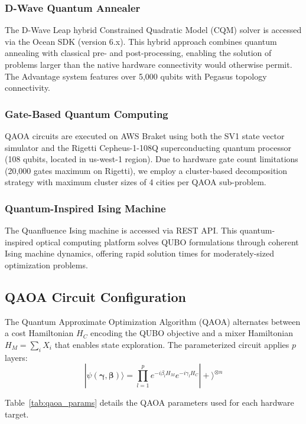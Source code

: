 \documentclass[conference]{IEEEtran}
\begin{document}
\subsubsection{D-Wave Quantum Annealer}
The D-Wave Leap hybrid Constrained Quadratic Model (CQM) solver is accessed via the Ocean SDK (version 6.x). This hybrid approach combines quantum annealing with classical pre- and post-processing, enabling the solution of problems larger than the native hardware connectivity would otherwise permit. The Advantage system features over 5,000 qubits with Pegasus topology connectivity.

\subsubsection{Gate-Based Quantum Computing}
QAOA circuits are executed on AWS Braket using both the SV1 state vector simulator and the Rigetti Cepheus-1-108Q superconducting quantum processor (108 qubits, located in us-west-1 region). Due to hardware gate count limitations (20,000 gates maximum on Rigetti), we employ a cluster-based decomposition strategy with maximum cluster sizes of 4 cities per QAOA sub-problem.

\subsubsection{Quantum-Inspired Ising Machine}
The Quanfluence Ising machine is accessed via REST API. This quantum-inspired optical computing platform solves QUBO formulations through coherent Ising machine dynamics, offering rapid solution times for moderately-sized optimization problems.

\subsection{QAOA Circuit Configuration}

The Quantum Approximate Optimization Algorithm (QAOA) alternates between a cost Hamiltonian $H_C$ encoding the QUBO objective and a mixer Hamiltonian $H_M = \sum_i X_i$ that enables state exploration. The parameterized circuit applies $p$ layers:
\begin{equation}
|\psi(\boldsymbol{\gamma}, \boldsymbol{\beta})\rangle = \prod_{l=1}^{p} e^{-i\beta_l H_M} e^{-i\gamma_l H_C} |+\rangle^{\otimes n}
\label{eq:qaoa}
\end{equation}

Table~\ref{tab:qaoa_params} details the QAOA parameters used for each hardware target.
\end{document}
